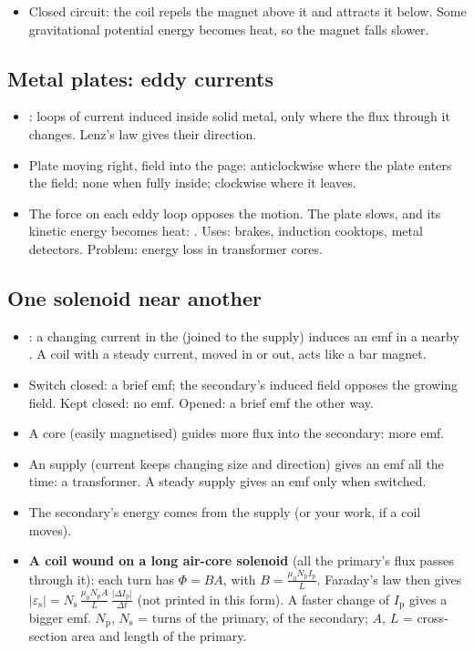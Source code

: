 \begin{itemize}
  \item Closed circuit: the coil repels the magnet above it and attracts it below.
        Some gravitational potential energy becomes heat, so the magnet falls slower.
\end{itemize}

\subsection{Metal plates: eddy currents}
\begin{itemize}
  \item {}: loops of current induced inside solid metal, only where
        the flux through it changes. Lenz's law gives their direction.
  \item Plate moving right, field into the page: anticlockwise where the plate enters
        the field; none when fully inside; clockwise where it leaves.
  \item The force on each eddy loop opposes the motion. The plate slows, and its
        kinetic energy becomes heat: . Uses: brakes, induction
        cooktops, metal detectors. Problem: energy loss in transformer cores.
\end{itemize}

\subsection{One solenoid near another}
\begin{itemize}
  \item {}: a changing current in the  (joined
        to the supply) induces an emf in a nearby . A coil with a
        steady current, moved in or out, acts like a bar magnet.
  \item Switch closed: a brief emf; the secondary's induced field opposes the growing
        field. Kept closed: no emf. Opened: a brief emf the other way.
  \item A  core (easily magnetised) guides more flux into the
        secondary: more emf.
  \item An  supply (current keeps changing size and direction) gives an emf
        all the time: a transformer. A steady  supply gives an emf only when
        switched.
  \item The secondary's energy comes from the supply (or your work, if a coil moves).
  \item \textbf{A coil wound on a long air-core solenoid} (all the primary's flux passes
        through it): each turn has $\Phi = BA$, with
        $B = \frac{\mu_0 N_\mathrm{p} I_\mathrm{p}}{L}$. Faraday's law then gives
        $\lvert\varepsilon_\mathrm{s}\rvert = N_\mathrm{s}\,\frac{\mu_0 N_\mathrm{p}
        A}{L}\,\frac{\lvert\Delta I_\mathrm{p}\rvert}{\Delta t}$ (not printed in this
        form). A faster change of $I_\mathrm{p}$ gives a bigger emf. $N_\mathrm{p}$,
        $N_\mathrm{s}$ = turns of the primary, of the secondary; $A$, $L$ = cross-section
        area and length of the primary.
\end{itemize}

